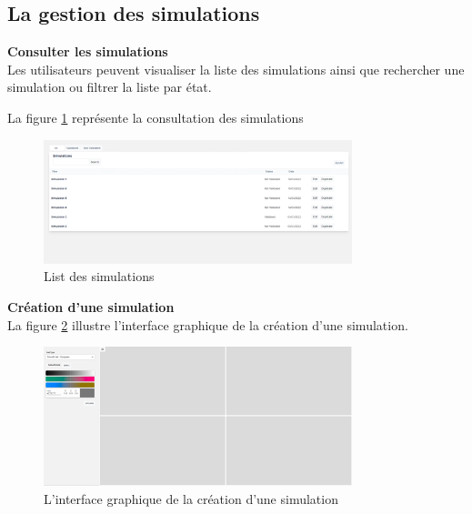\newpage
\subsection{La gestion des simulations}
\textbf{Consulter les simulations}
\\
Les utilisateurs peuvent visualiser la liste des simulations ainsi que rechercher une simulation ou filtrer la liste par état.

La figure \ref{fig:simu} représente la consultation des simulations
\begin{figure}[!ht]\centering
\includegraphics[width=0.8\textwidth]{chapitres/chapitre5/figures/ListSimu.png}
\caption{List des simulations}
\label{fig:simu}
\end{figure}

\textbf{Création d’une simulation}
\\
La figure \ref{fig:simu2} illustre l’interface graphique de la création d’une simulation.
\begin{figure}[!ht]\centering
\includegraphics[width=0.8\textwidth]{chapitres/chapitre5/figures/AjoutSimu.png}
\caption{L’interface graphique de la création d’une simulation}
\label{fig:simu2}
\end{figure}

